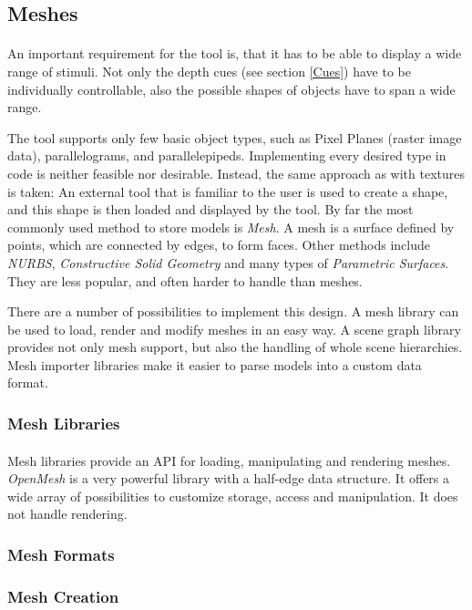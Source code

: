\subsection{Meshes\label{Meshes}}
\paragraph{}
An important requirement for the tool is, that it has to be able to display a wide range of stimuli. Not only the depth cues (see section \ref{Cues}) have to be individually controllable, also the possible shapes of objects have to span a wide range.

The tool supports only few basic object types, such as Pixel Planes (raster image data), parallelograms, and parallelepipeds. Implementing every desired type in code is neither feasible nor desirable.
Instead, the same approach as with textures is taken: An external tool that is familiar to the user is used to create a shape, and this shape is then loaded and displayed by the tool. By far the most commonly used method to store models is \textit{Mesh}. A mesh is a surface defined by points, which are connected by edges, to form faces. Other methods include \textit{NURBS}, \textit{Constructive Solid Geometry} and many types of \textit{Parametric Surfaces}. They are less popular, and often harder to handle than meshes.

There are a number of possibilities to implement this design. A mesh library can be used to load, render and modify meshes in an easy way. A scene graph library provides not only mesh support, but also the handling of whole scene hierarchies. Mesh importer libraries make it easier to parse models into a custom data format.


\subsubsection{Mesh Libraries}
\paragraph{}
Mesh libraries provide an API for loading, manipulating and rendering meshes. \textit{OpenMesh} is a very powerful library with a half-edge data structure. It offers a wide array of possibilities to customize storage, access and manipulation. It does not handle rendering.

\paragraph{}


\subsubsection{Mesh Formats}
\paragraph{}

\subsubsection{Mesh Creation}
\paragraph{}
